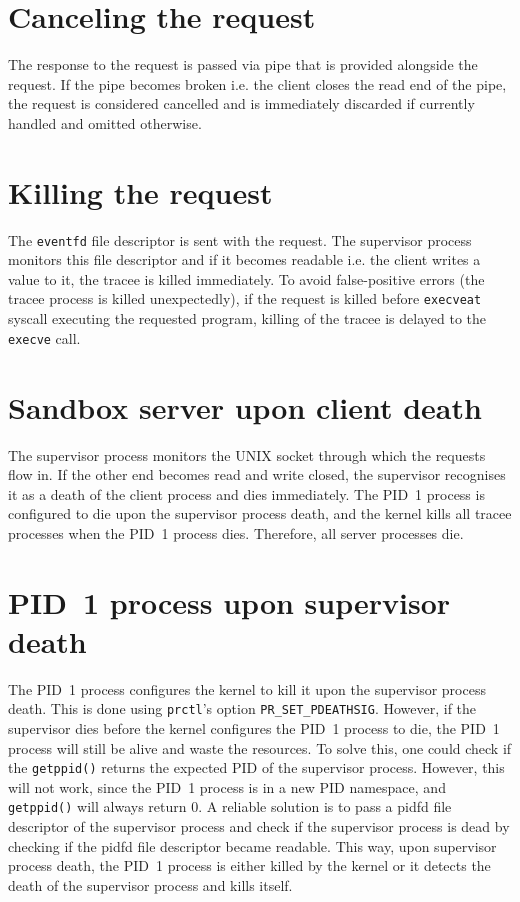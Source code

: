 \documentclass[en]{pracamgr}
\begin{document}
\section{Canceling the request}

The response to the request is passed via pipe that is provided alongside the request. If the pipe becomes broken i.e. the client closes the read end of the pipe, the request is considered cancelled and is immediately discarded if currently handled and omitted otherwise.

\section{Killing the request}

The \texttt{eventfd} file descriptor is sent with the request. The supervisor process monitors this file descriptor and if it becomes readable i.e. the client writes a value to it, the tracee is killed immediately. To avoid false-positive errors (the tracee process is killed unexpectedly), if the request is killed before \texttt{execveat} syscall executing the requested program, killing of the tracee is delayed to the \texttt{execve} call.

\section{Sandbox server upon client death}

The supervisor process monitors the UNIX socket through which the requests flow in. If the other end becomes read and write closed, the supervisor recognises it as a death of the client process and dies immediately. The PID~1 process is configured to die upon the supervisor process death, and the kernel kills all tracee processes when the PID~1 process dies. Therefore, all server processes die.

\section{PID~1 process upon supervisor death}

The PID~1 process configures the kernel to kill it upon the supervisor process death. This is done using \texttt{prctl}'s option \texttt{PR\_SET\_PDEATHSIG}. However, if the supervisor dies before the kernel configures the PID~1 process to die, the PID~1 process will still be alive and waste the resources. To solve this, one could check if the \texttt{getppid()} returns the expected PID of the supervisor process. However, this will not work, since the PID~1 process is in a new PID namespace, and \texttt{getppid()} will always return 0. A reliable solution is to pass a pidfd file descriptor of the supervisor process and check if the supervisor process is dead by checking if the pidfd file descriptor became readable. This way, upon supervisor process death, the PID~1 process is either killed by the kernel or it detects the death of the supervisor process and kills itself.
\end{document}
